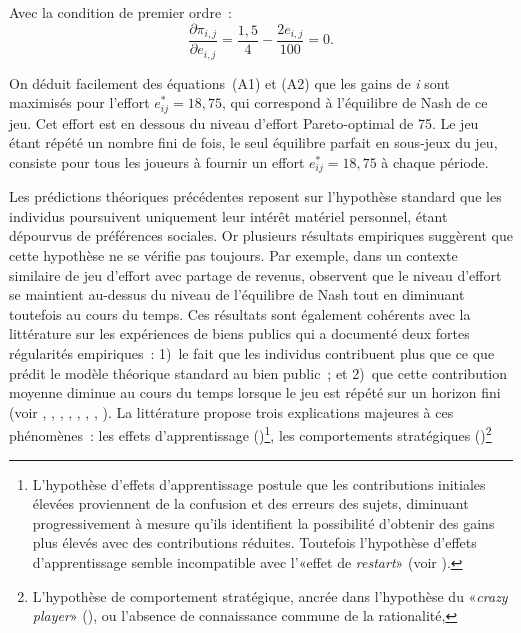 \begin{Article}
\begin{refsection}[Lebourges]
\begin{appendices}
Avec la condition de premier ordre~:
\begin{equation}
  \frac{\partial\pi_{i,j}}{\partial e_{i,j}} = \frac{1,5}{4} - \frac{2e_{i,j}}{100} = 0.
\end{equation}

On déduit facilement des équations~(A1) et (A2) que les gains de
\emph{i} sont maximisés pour l'effort \(e_{ij}^{*} = 18,75\), qui
correspond à l'équilibre de Nash de ce jeu. Cet effort est en dessous du
niveau d'effort Pareto-optimal de 75. Le jeu étant répété un nombre fini
de fois, le seul équilibre parfait en sous-jeux du jeu, consiste pour
tous les joueurs à fournir un effort \(e_{ij}^{*} = 18,75\) à chaque
période.

Les prédictions théoriques précédentes reposent sur l'hypothèse standard
que les individus poursuivent uniquement leur intérêt matériel
personnel, étant dépourvus de préférences sociales. Or plusieurs
résultats empiriques suggèrent que cette hypothèse ne se vérifie pas
toujours. Par exemple, dans un contexte similaire de jeu d'effort avec
partage de revenus, \textcite{NalbantianSchotter1997} observent que le
niveau d'effort se maintient au-dessus du niveau de l'équilibre de Nash
tout en diminuant toutefois au cours du temps. Ces résultats sont
également cohérents avec la littérature sur les expériences de biens
publics qui a documenté deux fortes régularités empiriques~: 1)~le fait
que les individus contribuent plus que ce que prédit le modèle théorique
standard au bien public~; et 2)~que cette contribution moyenne diminue
au cours du temps lorsque le jeu est répété sur un horizon fini (voir \textcite{Ledyard1995}, \textcite{Andreoni1995}, \textcite{Croson1996}, \textcite{KeserVanWinder2000}, \textcite{FehrGächter2000}, \textcite{MascletNoussairTuckerVilleval2003}, \textcite{HerrmannThoniGächter2008}, \textcite{KriegSamek2017}). La littérature propose trois explications majeures à ces
phénomènes~: les effets d'apprentissage (\textcite{Andreoni1988})\footnote{L'hypothèse d'effets d'apprentissage postule que
  les contributions initiales élevées proviennent de la confusion et des
  erreurs des sujets, diminuant progressivement à mesure qu'ils
  identifient la possibilité d'obtenir des gains plus élevés avec des
  contributions réduites. Toutefois l'hypothèse d'effets d'apprentissage
  semble incompatible avec l'«effet de \emph{restart}» (voir \textcite{Andreoni1988}).}, les comportements stratégiques (\textcite{KrepsMilgromRobertsWilson1982})\footnote{L'hypothèse de comportement stratégique, ancrée
  dans l'hypothèse du «\emph{crazy player}» (\textcite{KrepsMilgromRobertsWilson1982}), ou l'absence de connaissance commune de la rationalité,
}
\end{appendices}
\end{refsection}
\end{Article}
